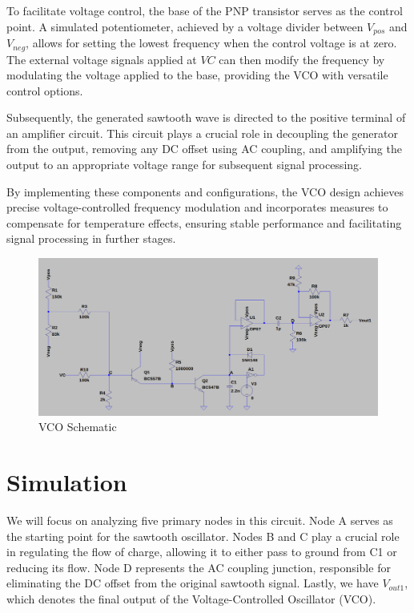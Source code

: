 \documentclass{article}
\begin{document}
To facilitate voltage control, the base of the PNP transistor serves as the control point. A simulated potentiometer, achieved by a voltage divider between $V_{pos}$ and $V_{neg}$, allows for setting the lowest frequency when the control voltage is at zero. The external voltage signals applied at $VC$ can then modify the frequency by modulating the voltage applied to the base, providing the VCO with versatile control options.

Subsequently, the generated sawtooth wave is directed to the positive terminal of an amplifier circuit. This circuit plays a crucial role in decoupling the generator from the output, removing any DC offset using AC coupling, and amplifying the output to an appropriate voltage range for subsequent signal processing.

By implementing these components and configurations, the VCO design achieves precise voltage-controlled frequency modulation and incorporates measures to compensate for temperature effects, ensuring stable performance and facilitating signal processing in further stages.


\begin{figure}[H]
  \includegraphics[width=1\linewidth]{png/vco_schem.png}
  \caption{VCO Schematic}
\end{figure}


\section*{\textcolor{mycolor}{Simulation}}
We will focus on analyzing five primary nodes in this circuit. Node A serves as the starting point for the sawtooth oscillator. Nodes B and C play a crucial role in regulating the flow of charge, allowing it to either pass to ground from C1 or reducing its flow. Node D represents the AC coupling junction, responsible for eliminating the DC offset from the original sawtooth signal. Lastly, we have $V_{out1}$, which denotes the final output of the Voltage-Controlled Oscillator (VCO).
\end{document}
